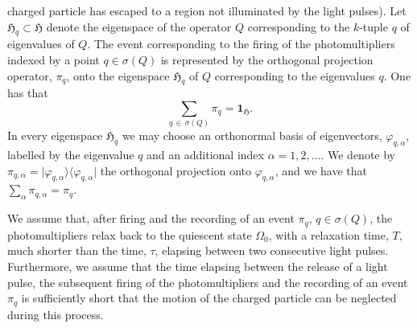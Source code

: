 \documentclass[11pt]{article}
\begin{document}
 charged particle has escaped to a region not illuminated by the light pulses). 
Let $\mathfrak{H}_q \subset \mathfrak{H}$ denote the eigenspace of the operator $Q$ corresponding 
to the $k$-tuple $q$ of eigenvalues of $Q$. The event corresponding to the firing of the photomultipliers
indexed by a point $q\in \sigma(Q)$ is represented by the orthogonal projection operator, $\pi_{q}$, onto the eigenspace 
$\mathfrak{H}_q$ of $Q$ corresponding to the eigenvalues $q$. One has that
$$\sum_{q\,\in\, \sigma(Q)} \pi_{q} = \mathbf{1}_{\mathfrak{H}}.$$
In every eigenspace $\mathfrak{H}_{q}$ we may choose an orthonormal basis of eigenvectors, $\varphi_{q, \alpha}$, 
labelled by the eigenvalue $q$ and an additional index $\alpha=1,2, \dots$. We denote by 
$\pi_{q,\alpha}= \vert \varphi_{q, \alpha}\rangle \langle \varphi_{q, \alpha}\vert $ the orthogonal projection onto 
$\varphi_{q, \alpha}$, and we have that $\sum_{\alpha} \pi_{q, \alpha} = \pi_q$.

We assume that, after firing and the recording of an event $\pi_{q}$, $q\in \sigma(Q)$, the photomultipliers relax 
back to the quiescent state $\Omega_0$, with a relaxation time, $T$, much shorter than the time, $\tau$, elapsing between 
two consecutive light pulses. Furthermore, we assume that the time elapsing between the release of a light pulse, 
the subsequent firing of the photomultipliers and the recording of an event $\pi_q$ is sufficiently short 
that the motion of the charged particle can be neglected during this process. 
\end{document}

